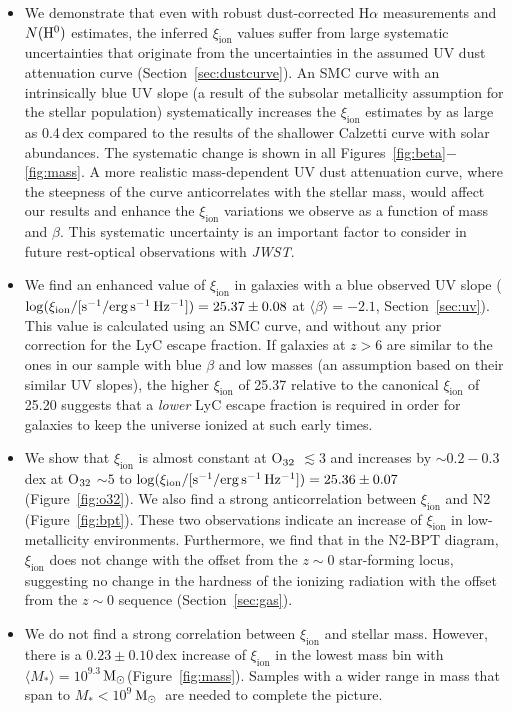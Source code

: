 \documentclass[iop]{emulateapj}
\newcommand{\xiion}{\ensuremath{\xi_{\mathrm{ion}}}}
\newcommand{\halpha}{H\ensuremath{\alpha}}
\def\o32{{O$_{\rm 32}$}}
\def\msun{${\rm M_\odot}$}
\begin{document}
\begin{itemize}
\item We demonstrate that even with robust dust-corrected {\halpha} measurements and $N({\rm H}^0)$ estimates, the inferred {\xiion} values suffer from large systematic uncertainties that originate from the uncertainties in the assumed UV dust attenuation curve (Section~\ref{sec:dustcurve}). An SMC curve with an intrinsically blue UV slope (a result of the subsolar metallicity assumption for the stellar population) systematically increases the {\xiion} estimates by as large as 0.4\,dex compared to the results of the shallower Calzetti curve with solar abundances. The systematic change is shown in all Figures~\ref{fig:beta}$-$\ref{fig:mass}. A more realistic mass-dependent UV dust attenuation curve, where the steepness of the curve anticorrelates with the stellar mass, would affect our results and enhance the {\xiion} variations we observe as a function of mass and $\beta$. This systematic uncertainty is an important factor to consider in future rest-optical observations with {\em JWST}.

\item We find an enhanced value of {\xiion} in galaxies with a blue observed UV slope ($\log(\xi_{\rm{ion}}/[{\rm{s^{-1}/erg\,s^{-1}\,Hz^{-1}}}])=25.37\pm 0.08$ at $\langle \beta\rangle=-2.1$, Section~\ref{sec:uv}). This value is calculated using an SMC curve, and without any prior correction for the LyC escape fraction.
If galaxies at $z>6$ are similar to the ones in our sample with blue $\beta$ and low masses (an assumption based on their similar UV slopes), the higher {\xiion} of 25.37 relative to the canonical {\xiion} of 25.20 suggests that a {\em lower} LyC escape fraction is required in order for galaxies to keep the universe ionized at such early times.

\item We show that {\xiion} is almost constant at {\o32} $\lesssim 3$ and increases by $\sim 0.2-0.3$\,dex at {\o32} $\sim 5$ to $\log(\xi_{\rm{ion}}/[{\rm{s^{-1}/erg\,s^{-1}\,Hz^{-1}}}])=25.36\pm 0.07$ (Figure~\ref{fig:o32}).
We also find a strong anticorrelation between {\xiion} and N2 (Figure~\ref{fig:bpt}). These two observations indicate an increase of {\xiion} in low-metallicity environments.
Furthermore, we find that in the N2-BPT diagram, {\xiion} does not change with the offset from the $z\sim 0$ star-forming locus, suggesting no change in the hardness of the ionizing radiation with the offset from the $z\sim 0$ sequence (Section~\ref{sec:gas}).

\item We do not find a strong correlation between {\xiion} and stellar mass. However, there is a $0.23\pm 0.10$\,dex increase of {\xiion} in the lowest mass bin with $\langle M_*\rangle=10^{9.3}$\,\msun (Figure~\ref{fig:mass}). Samples with a wider range in mass that span to $M_*<10^9$\,\msun~are needed to complete the picture.


\end{itemize}
\end{document}
